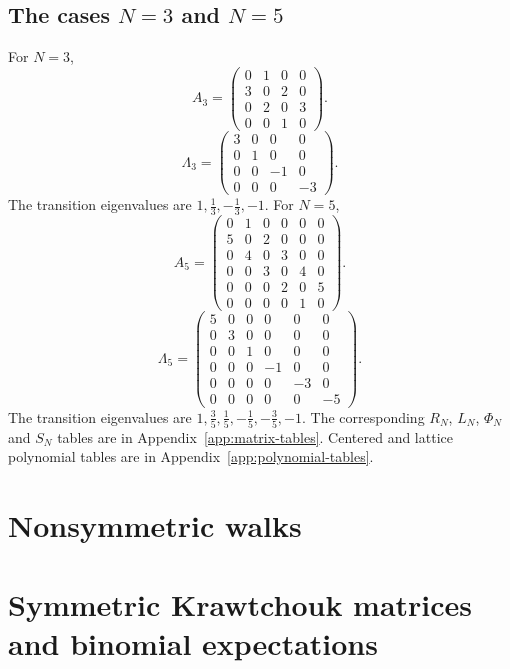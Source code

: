 \subsection{The cases $N=3$ and $N=5$}
For $N=3$,
\begingroup
\small
\setlength{\arraycolsep}{3pt}
\[
A_{3}=\begin{pmatrix}
0 & 1 & 0 & 0 \\
3 & 0 & 2 & 0 \\
0 & 2 & 0 & 3 \\
0 & 0 & 1 & 0
\end{pmatrix}.
\]
\endgroup
\begingroup
\small
\setlength{\arraycolsep}{3pt}
\[
\Lambda_{3}=\begin{pmatrix}
3 & 0 & 0 & 0 \\
0 & 1 & 0 & 0 \\
0 & 0 & -1 & 0 \\
0 & 0 & 0 & -3
\end{pmatrix}.
\]
\endgroup
The transition eigenvalues are $1,\frac{1}{3},- \frac{1}{3},-1$.
For $N=5$,
\begingroup
\small
\setlength{\arraycolsep}{3pt}
\[
A_{5}=\begin{pmatrix}
0 & 1 & 0 & 0 & 0 & 0 \\
5 & 0 & 2 & 0 & 0 & 0 \\
0 & 4 & 0 & 3 & 0 & 0 \\
0 & 0 & 3 & 0 & 4 & 0 \\
0 & 0 & 0 & 2 & 0 & 5 \\
0 & 0 & 0 & 0 & 1 & 0
\end{pmatrix}.
\]
\endgroup
\begingroup
\small
\setlength{\arraycolsep}{3pt}
\[
\Lambda_{5}=\begin{pmatrix}
5 & 0 & 0 & 0 & 0 & 0 \\
0 & 3 & 0 & 0 & 0 & 0 \\
0 & 0 & 1 & 0 & 0 & 0 \\
0 & 0 & 0 & -1 & 0 & 0 \\
0 & 0 & 0 & 0 & -3 & 0 \\
0 & 0 & 0 & 0 & 0 & -5
\end{pmatrix}.
\]
\endgroup
The transition eigenvalues are $1,\frac{3}{5},\frac{1}{5},- \frac{1}{5},- \frac{3}{5},-1$.
The corresponding $R_N$, $L_N$, $\Phi_N$ and $S_N$ tables are in
Appendix~\ref{app:matrix-tables}. Centered and lattice polynomial tables
are in Appendix~\ref{app:polynomial-tables}.

\section{Nonsymmetric walks}
\label{sec:2-3}

\section{Symmetric Krawtchouk matrices and binomial expectations}
\label{sec:2-4}

